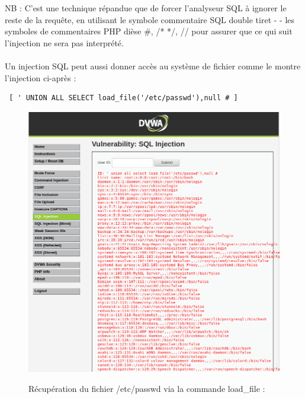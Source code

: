 NB : C'est une technique répandue que de forcer l'analyseur SQL à ignorer le reste de la requête, en utilisant le symbole commentaire SQL double tiret - - les symboles de commentaires PHP dièse \#, {/* */}, {//} pour assurer que ce qui suit l'injection ne sera pas interprété.  


\paragraph{}
Un injection SQL peut aussi donner accès au système de fichier comme le montre l'injection ci-après :
\begin{verbatim} [ ' UNION ALL SELECT load_file('/etc/passwd'),null # ] \end{verbatim}

\begin{figure}[!h]
	\begin{center}
		\label{}
		\includegraphics[scale=\scaledvwa]{images/sql/sqli_low2.png}
		\caption{Récupération du fichier /etc/passwd via la commande load\_file : }
	\end{center}
\end{figure}




